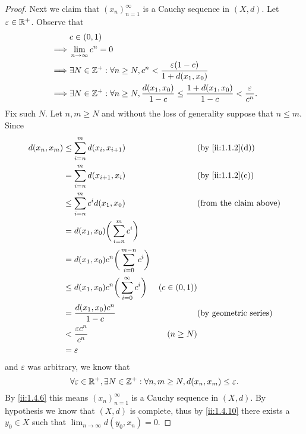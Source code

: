 \begin{proof}
  Next we claim that \((x_n)_{n = 1}^\infty\) is a Cauchy sequence in \((X, d)\).
  Let \(\varepsilon \in \mathbb{R}^+\).
  Observe that
  \begin{align*}
             & c \in (0, 1)                                                                                                                      \\
    \implies & \lim_{n \to \infty} c^n = 0                                                                                                       \\
    \implies & \exists N \in \mathbb{Z}^+ : \forall n \geq N, c^n < \dfrac{\varepsilon (1 - c)}{1 + d(x_1, x_0)}                                         \\
    \implies & \exists N \in \mathbb{Z}^+ : \forall n \geq N, \dfrac{d(x_1, x_0)}{1 - c} \leq \dfrac{1 + d(x_1, x_0)}{1 - c} < \dfrac{\varepsilon}{c^n}.
  \end{align*}
  Fix such \(N\).
  Let \(n, m \geq N\) and without the loss of generality suppose that \(n \leq m\).
  Since
  \begin{align*}
    d(x_n, x_m) & \leq \sum_{i = n}^m d(x_i, x_{i + 1})                    &                & \by{ii:1.1.2}[d]              \\
                & = \sum_{i = n}^m d(x_{i + 1}, x_i)                       &                & \by{ii:1.1.2}[c]              \\
                & \leq \sum_{i = n}^m c^i d(x_1, x_0)                      &                & \text{(from the claim above)} \\
                & = d(x_1, x_0) \bigg(\sum_{i = n}^m c^i\bigg)                                                              \\
                & = d(x_1, x_0) c^n \bigg(\sum_{i = 0}^{m - n} c^i\bigg)                                                    \\
                & \leq d(x_1, x_0) c^n \bigg(\sum_{i = 0}^\infty c^i\bigg) & (c \in (0, 1))                                 \\
                & = \dfrac{d(x_1, x_0) c^n}{1 - c}                         &                & \text{(by geometric series)}  \\
                & < \dfrac{\varepsilon c^n}{c^n}                           & (n \geq N)                                     \\
                & = \varepsilon
  \end{align*}
  and \(\varepsilon\) was arbitrary, we know that
  \[
    \forall \varepsilon \in \mathbb{R}^+, \exists N \in \mathbb{Z}^+ : \forall n, m \geq N, d(x_n, x_m) \leq \varepsilon.
  \]
  By \cref{ii:1.4.6} this means \((x_n)_{n = 1}^\infty\) is a Cauchy sequence in \((X, d)\).
  By hypothesis we know that \((X, d)\) is complete, thus by \cref{ii:1.4.10} there exists a \(y_0 \in X\) such that \(\lim_{n \to \infty} d(y_0, x_n) = 0\).


\end{proof}
